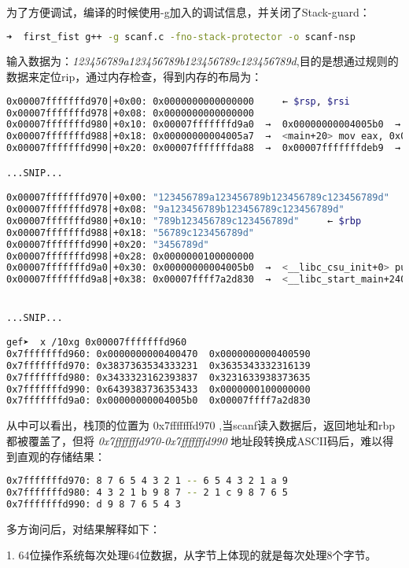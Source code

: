 \documentclass[12pt]{article}  %
\begin{document}
为了方便调试，编译的时候使用-g加入的调试信息，并关闭了Stack-guard：
\begin{lstlisting}[language=sh]
➜  first_fist g++ -g scanf.c -fno-stack-protector -o scanf-nsp
\end{lstlisting}\par
输入数据为：\emph{123456789a123456789b123456789c123456789d},目的是想通过规则的数据来定位rip，通过内存检查，得到内存的布局为：
\begin{lstlisting}[language=sh]
0x00007fffffffd970│+0x00: 0x0000000000000000	 ← $rsp, $rsi
0x00007fffffffd978│+0x08: 0x0000000000000000
0x00007fffffffd980│+0x10: 0x00007fffffffd9a0  →  0x00000000004005b0  →  <__libc_csu_init+0> push r15	 ← $rbp
0x00007fffffffd988│+0x18: 0x00000000004005a7  →  <main+20> mov eax, 0x0
0x00007fffffffd990│+0x20: 0x00007fffffffda88  →  0x00007fffffffdeb9  →  "/home/csober/Documents/Github/how2stack/first_fist[...]"

...SNIP...

0x00007fffffffd970│+0x00: "123456789a123456789b123456789c123456789d"	 ← $rsp
0x00007fffffffd978│+0x08: "9a123456789b123456789c123456789d"
0x00007fffffffd980│+0x10: "789b123456789c123456789d"	 ← $rbp
0x00007fffffffd988│+0x18: "56789c123456789d"
0x00007fffffffd990│+0x20: "3456789d"
0x00007fffffffd998│+0x28: 0x0000000100000000
0x00007fffffffd9a0│+0x30: 0x00000000004005b0  →  <__libc_csu_init+0> push r15
0x00007fffffffd9a8│+0x38: 0x00007ffff7a2d830  →  <__libc_start_main+240> mov edi, eax


...SNIP...

gef➤  x /10xg 0x00007fffffffd960
0x7fffffffd960:	0x0000000000400470	0x0000000000400590
0x7fffffffd970:	0x3837363534333231	0x3635343332316139
0x7fffffffd980:	0x3433323162393837	0x3231633938373635
0x7fffffffd990:	0x6439383736353433	0x0000000100000000
0x7fffffffd9a0:	0x00000000004005b0	0x00007ffff7a2d830

\end{lstlisting}\par
从中可以看出，栈顶的位置为 0x7fffffffd970 ,当scanf读入数据后，返回地址和rbp都被覆盖了，但将 \emph{0x7fffffffd970-0x7fffffffd990} 地址段转换成ASCII码后，难以得到直观的存储结果：
\begin{lstlisting}[language=sh]
0x7fffffffd970:	8 7 6 5 4 3 2 1	-- 6 5 4 3 2 1 a 9
0x7fffffffd980:	4 3 2 1 b 9 8 7 -- 2 1 c 9 8 7 6 5
0x7fffffffd990: d 9 8 7 6 5 4 3
\end{lstlisting}\par
多方询问后，对结果解释如下：\par
1. 64位操作系统每次处理64位数据，从字节上体现的就是每次处理8个字节。 \par
\end{document}
